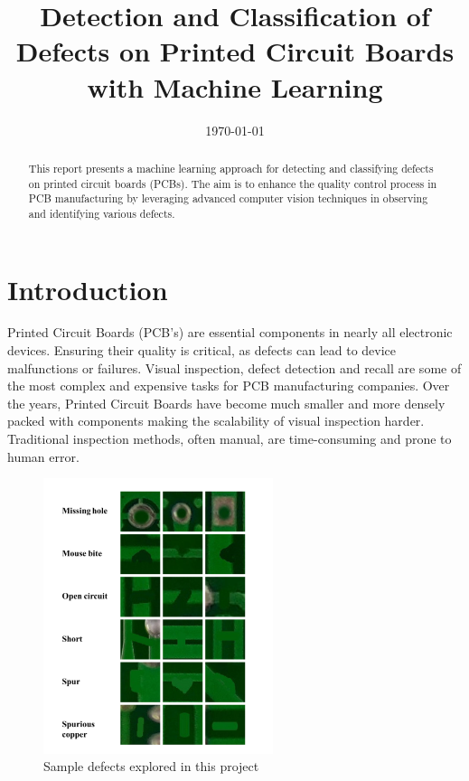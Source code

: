 \documentclass[12pt]{article}
\title{Detection and Classification of Defects on Printed Circuit Boards with Machine Learning\\\phantom{.}}
\date{\today}
\begin{document}
\thispagestyle{empty}
\maketitle
\thispagestyle{empty}

\tableofcontents
\thispagestyle{empty}

\clearpage
\newpage

\vspace{2.5cm}

\begin{abstract}

This report presents a machine learning approach for detecting and classifying defects on printed circuit boards (PCBs). The aim is to enhance the quality control process in PCB manufacturing by leveraging advanced computer vision techniques in observing and identifying various defects.  
\end{abstract}

\clearpage
\newpage

\section{Introduction}

Printed Circuit Boards (PCB's) are essential components in nearly all electronic devices. Ensuring their quality is critical, as defects can lead to device malfunctions or failures. Visual inspection, defect detection and recall are some of the most complex and expensive tasks for PCB manufacturing companies. Over the years, Printed Circuit Boards have become much smaller and more densely packed with components making the scalability of visual inspection harder. Traditional inspection methods, often manual, are time-consuming and prone to human error.

\begin{figure}[h]
    \centering
    \includegraphics[width=0.6\textwidth]{./graphics/Defects.png}
    \caption{Sample defects explored in this project}
    \label{fig:defects}
\end{figure}
\end{document}
